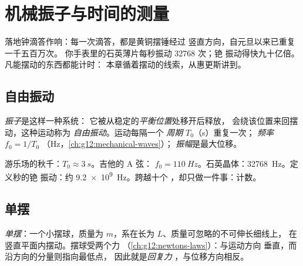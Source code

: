 \chapter{机械振子与时间的测量}\label{ch:g12:oscillators-and-time}

落地钟滴答作响：每一次滴答，都是黄铜摆锤经过
竖直方向，自元旦以来已重复一千五百万次。
你手表里的石英薄片每秒振动 \num{32768} 次；铯
振动得快九十亿倍。凡能摆动的东西都能计时：
本章循着摆动的线索，从惠更斯讲到。

\section{自由振动}

\begin{definition}[振子、周期、频率、振幅]\label{def:g12:oscillators-and-time:oscillator}
\emph{振子}是这样一种系统：
它被从稳定的\emph{平衡位置}处移开后释放，
会绕该位置来回摆动，这种运动称为
\emph{自由振动}。运动每隔一个
\emph{周期} $T_0$（\unit{s}）重复一次；
\emph{频率} $f_0 = 1/T_0$
（\unit{Hz}，\cref{ch:g12:mechanical-waves}）；
\emph{振幅}是最大位移。
\end{definition}

\begin{example}[形形色色的振子]\label{ex:g12:oscillators-and-time:zoo}
游乐场的秋千：$T_0 \approx \qty{3}{s}$。吉他的 A 弦：
$f_0 = \qty{110}{Hz}$。石英晶体：\qty{32768}{Hz}。定义秒的铯
振动：约 \qty{9.2e9}{Hz}。跨越十个
，却只做一件事：计数。
\end{example}

\section{单摆}

\begin{definition}[单摆]\label{def:g12:oscillators-and-time:pendulum}
\emph{单摆}：一个小摆球，质量为
$m$，系在长为 $L$、质量可忽略的不可伸长细线上，
在竖直平面内摆动。摆球受两个力
（\cref{ch:g12:newtons-laws}）：与运动方向
垂直，而沿方向的分量则指向最低点，
因此就是\emph{回复力}%
，与位移方向相反。
\end{definition}

